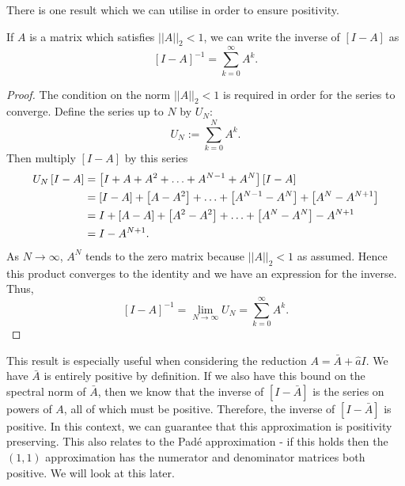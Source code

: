 There is one result which we can utilise in order to ensure positivity.
\begin{lemma}
    \label{lem:positiveinverse}
    If $A$ is a matrix which satisfies $||A||_2 < 1$, we can write the inverse of $[I-A]$ as
    \begin{equation*}
        \left[ I - A \right]^{-1} = \sum_{k=0}^{\infty} A^k.
    \end{equation*}
\end{lemma}
\begin{proof}
    The condition on the norm $||A||_2 < 1$ is required in order for the series to converge.
    Define the series up to $N$ by $U_N:$
    \begin{equation*}
        U_N := \sum_{k=0}^{N} A^k.
    \end{equation*}
    Then multiply $[I-A]$ by this series
    \begin{align*}
        U_N \left[ I-A \right] &= \left[ I + A + A^2 + \mathellipsis + A^{N-1} + A^N \right] \left[ I - A \right] \\
        &= [I-A] + \left[ A-A^2 \right] + \mathellipsis + \left[ A^{N-1} - A^N \right] + \left[ A^N - A^{N+1} \right] \\
        &= I + [A-A] + \left[ A^2 - A^2 \right] + \mathellipsis + \left[ A^N - A^N \right] - A^{N+1} \\
        &= I - A^{N+1}.
    \end{align*}
    As $N \rightarrow \infty$, $A^N$ tends to the zero matrix because $||A||_2 < 1$ as assumed.
    Hence this product converges to the identity and we have an expression for the inverse.
    Thus,
    \begin{equation*}
        \left[ I - A \right]^{-1} = \lim_{N\rightarrow \infty}U_N = \sum_{k=0}^{\infty} A^k.
    \end{equation*}
\end{proof}
This result is especially useful when considering the reduction $A = \bar{A} + \hat{a}I$.
We have $\bar{A}$ is entirely positive by definition.
If we also have this bound on the spectral norm of $\bar{A}$,
then we know that the inverse of $[I-\bar{A}]$ is the series on powers of $A$, all of which must be positive.
Therefore, the inverse of $[I-\bar{A}]$ is positive.
In this context, we can guarantee that this approximation is positivity preserving.
This also relates to the Pad\'e approximation - if this holds then the $(1,1)$ approximation has the numerator and denominator matrices both positive.
We will look at this later.

